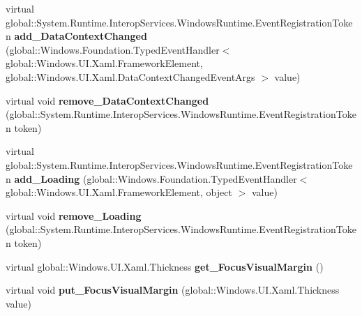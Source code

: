 \begin{DoxyCompactItemize}
virtual global\+::\+System.\+Runtime.\+Interop\+Services.\+Windows\+Runtime.\+Event\+Registration\+Token {\bfseries add\+\_\+\+Data\+Context\+Changed} (global\+::\+Windows.\+Foundation.\+Typed\+Event\+Handler$<$ global\+::\+Windows.\+U\+I.\+Xaml.\+Framework\+Element, global\+::\+Windows.\+U\+I.\+Xaml.\+Data\+Context\+Changed\+Event\+Args $>$ value)
\item 
\mbox{\label{class_windows_1_1_u_i_1_1_xaml_1_1_framework_element_aeb7ffc9376ba20a677d338c3c42ca767}} 
virtual void {\bfseries remove\+\_\+\+Data\+Context\+Changed} (global\+::\+System.\+Runtime.\+Interop\+Services.\+Windows\+Runtime.\+Event\+Registration\+Token token)
\item 
\mbox{\label{class_windows_1_1_u_i_1_1_xaml_1_1_framework_element_a98b5b4501ee2b393150f26b7ee822e88}} 
virtual global\+::\+System.\+Runtime.\+Interop\+Services.\+Windows\+Runtime.\+Event\+Registration\+Token {\bfseries add\+\_\+\+Loading} (global\+::\+Windows.\+Foundation.\+Typed\+Event\+Handler$<$ global\+::\+Windows.\+U\+I.\+Xaml.\+Framework\+Element, object $>$ value)
\item 
\mbox{\label{class_windows_1_1_u_i_1_1_xaml_1_1_framework_element_a6ba35fb963a416a7b03b6ee63a82c138}} 
virtual void {\bfseries remove\+\_\+\+Loading} (global\+::\+System.\+Runtime.\+Interop\+Services.\+Windows\+Runtime.\+Event\+Registration\+Token token)
\item 
\mbox{\label{class_windows_1_1_u_i_1_1_xaml_1_1_framework_element_a1a058a053cdfa2551f3841b97735511c}} 
virtual global\+::\+Windows.\+U\+I.\+Xaml.\+Thickness {\bfseries get\+\_\+\+Focus\+Visual\+Margin} ()
\item 
\mbox{\label{class_windows_1_1_u_i_1_1_xaml_1_1_framework_element_abf95cce4264f515ac3309b6484f5835c}} 
virtual void {\bfseries put\+\_\+\+Focus\+Visual\+Margin} (global\+::\+Windows.\+U\+I.\+Xaml.\+Thickness value)
\item 
\mbox{\label{class_windows_1_1_u_i_1_1_xaml_1_1_framework_element_a1af8b4a08c326371edc3d91d80b4db81}} 

\end{DoxyCompactItemize}
